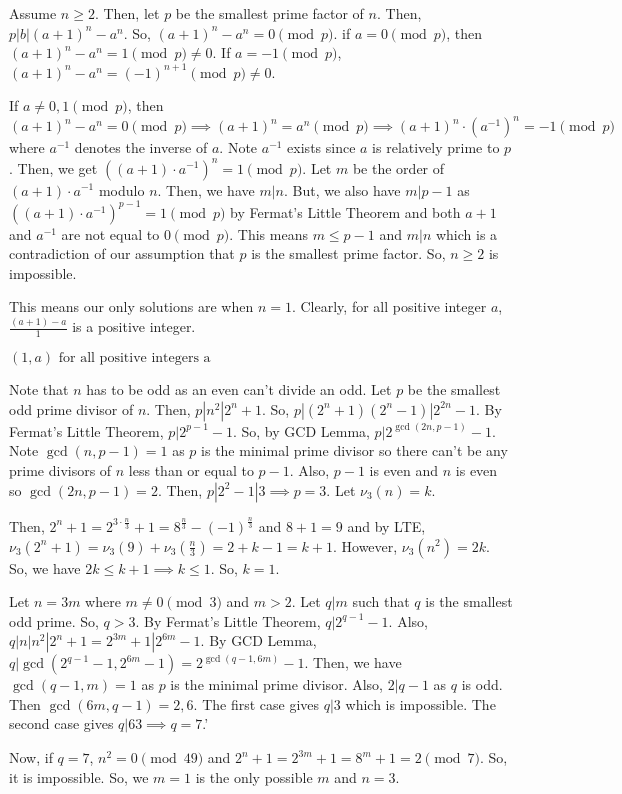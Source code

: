 \documentclass[11pt]{article}
\begin{document}

\begin{sol}
Assume $n\ge 2$. Then, let $p$ be the smallest prime factor of $n$. Then, $p|b|(a+1)^{n}-a^{n}$. So, $(a+1)^{n}-a^{n}=0\pmod{p}$. if $a=0\pmod{p}$, then $(a+1)^{n}-a^{n}=1\pmod{p}\neq 0$. If $a=-1\pmod{p}$, $(a+1)^{n}-a^{n}=(-1)^{n+1}\pmod{p}\neq 0$.

 If $a\neq 0,1\pmod{p}$, then $(a+1)^{n}-a^{n}=0\pmod{p}\implies (a+1)^{n}=a^{n}\pmod{p}\implies (a+1)^{n}\cdot (a^{-1})^{n}=-1\pmod{p}$ where $a^{-1}$ denotes the inverse of $a$. Note $a^{-1}$ exists since $a$ is relatively prime to $p$. Then, we get $((a+1)\cdot a^{-1})^{n}=1\pmod{p}$. Let $m$ be the order of $(a+1)\cdot a^{-1}$ modulo $n$. Then, we have $m|n$. But, we also have $m|p-1$ as $((a+1)\cdot a^{-1})^{p-1}=1\pmod{p}$ by Fermat\rq{s} Little Theorem and both $a+1$ and $a^{-1}$ are not equal to $0\pmod{p}$.  This means $m\leq p-1$ and $m|n$ which is a contradiction of our assumption that $p$ is the smallest prime factor. So, $n\ge 2$ is impossible.
 
 This means our only solutions are when $n=1$. Clearly, for all positive integer $a$, $\frac{(a+1)-a}{1}$ is a positive integer.
 
 $\boxed{(1,a) \text{ for all positive integers a}}$
\end{sol}

\begin{sol}
Note that $n$ has to be odd as an even can't divide an odd. Let $p$ be the smallest odd prime divisor of $n$. Then, $p|n^2|2^{n}+1$. So, $p|(2^{n}+1)(2^{n}-1)|2^{2n}-1$. By Fermat's Little Theorem, $p|2^{p-1}-1$. So, by GCD Lemma, $p|2^{\gcd(2n,p-1)}-1$. Note $\gcd(n,p-1)=1$ as $p$ is the minimal prime divisor so there can't be any prime divisors of $n$ less than or equal to $p-1$. Also, $p-1$ is even and $n$ is even so $\gcd(2n,p-1)=2$. Then, $p|2^{2}-1|3\implies p=3$. Let $\nu_{3}(n)=k$.

Then, $2^{n}+1=2^{3\cdot \frac{n}{3}}+1=8^{\frac{n}{3}}-(-1)^{\frac{n}{3}}$ and $8+1=9$ and by LTE, $\nu_{3}(2^{n}+1)=\nu_{3}(9)+\nu_{3}(\frac{n}{3})=2+k-1=k+1$. However, $\nu_{3}(n^2)=2k$. So, we have $2k\leq k+1\implies k\leq 1$. So, $k=1$.

Let $n=3m$ where $m\neq 0\pmod{3}$ and $m>2$. Let $q|m$ such that $q$ is the smallest odd prime. So, $q>3$. By Fermat's Little Theorem, $q|2^{q-1}-1$. Also, $q|n|n^2|2^{n}+1=2^{3m}+1|2^{6m}-1$. By GCD Lemma, $q|\gcd(2^{q-1}-1, 2^{6m}-1)=2^{\gcd(q-1,6m)}-1$. Then, we have $\gcd(q-1,m)=1$ as $p$ is the minimal prime divisor. Also,  $2|q-1$ as $q$ is odd. Then $\gcd(6m,q-1)=2,6$. The first case gives $q|3$ which is impossible. The second case gives $q|63\implies q=7$.'

Now, if $q=7$, $n^2=0\pmod{49}$ and $2^{n}+1=2^{3m}+1=8^{m}+1=2\pmod{7}$. So, it is impossible. So, we $m=1$ is the only possible $m$ and $n=3$.
\end{sol}
\end{document}
